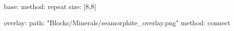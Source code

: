 base:
  method: repeat
  size: [8,8]

overlay:
  path: "Blocks/Minerals/seamorphite_overlay.png"
  method: connect